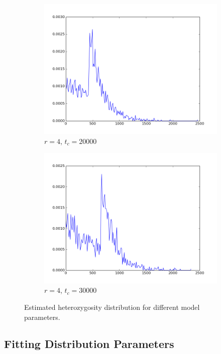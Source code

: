 \documentclass[a4paper]{article}
\begin{document}
\begin{figure}[h!]
\begin{subfigure}[b]{0.49\textwidth}
	\includegraphics[width=\textwidth]{figure_4_20000.png}
	\caption{$r = 4$, $t_c = 20000$}
\end{subfigure}
\begin{subfigure}[b]{0.49\textwidth}
	\includegraphics[width=\textwidth]{figure_4_30000.png}
	\caption{$r = 4$, $t_c = 30000$}
\end{subfigure}
\caption{Estimated heterozygosity distribution for different model parameters.}
\label{fig:hist}
\end{figure}

\subsection{Fitting Distribution Parameters}
\end{document}
